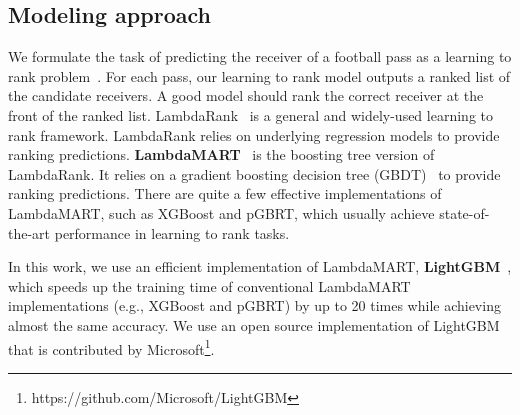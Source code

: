 

\subsection{Modeling approach}\label{model-approach}

We formulate the task of predicting the receiver of a football pass as a learning to rank problem~\cite{liu2009learning}. 
For each pass, our learning to rank model outputs a ranked list of the candidate receivers. 
A good model should rank the correct receiver at the front of the ranked list. 
LambdaRank~\cite{burges2010ranknet} is a general and widely-used learning to rank framework. %
LambdaRank relies on underlying regression models to provide ranking predictions.
\textbf{LambdaMART}~\cite{burges2010ranknet} is the boosting tree version of LambdaRank. It relies on a gradient boosting decision tree (GBDT)~\cite{friedman2001greedy} to provide ranking predictions.
There are quite a few effective implementations of LambdaMART, such as XGBoost and pGBRT, which usually achieve state-of-the-art performance in learning to rank tasks.

In this work, we use an efficient implementation of LambdaMART, \textbf{LightGBM}~\cite{NIPS2017_6907}, which speeds up the training time of conventional LambdaMART implementations (e.g., XGBoost and pGBRT) by up to 20 times while achieving almost the same accuracy. 
We use an open source implementation of LightGBM that is contributed by Microsoft\footnote{https://github.com/Microsoft/LightGBM}.


